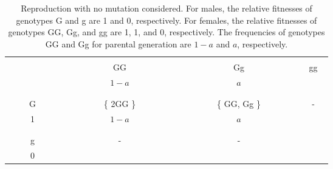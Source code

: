 \documentclass[referee,sn-basic]{sn-jnl}%
\theoremstyle{thmstyleone}%
\theoremstyle{thmstyletwo}%
\theoremstyle{thmstylethree}%
\begin{document}
\begin{table}[htp]
        \caption{Reproduction with no mutation considered. For males, the relative fitnesses of genotypes G and g are 1 and 0, respectively. For females, the relative fitnesses of genotypes GG, Gg, and gg are 1, 1, and 0, respectively. The frequencies of genotypes GG and Gg for parental generation are $1-a$ and $a$, respectively. \label{X-linked}
        }
        \begin{center}
                \begin{tabular}{ c!{\vrule width 1pt}c|c|c }
                        \hline
                        \vspace{-2mm}
                             &     &     &     \\
                       & GG    & Gg    & gg    \\
                        & $1\!-\!a$ & $a$     &       \\
                        \vspace{-3mm} &       &     \\
                        \vspace{-2mm}
                        &     &     &       \\
                        G      & \{ 2GG \} & \{ GG, Gg \}   &-      \\
                        1     & $1\!-\!a$  & $a$          &       \\
                        \vspace{-3mm}      &     &     &     \\
                        \hline
                        \vspace{-2mm}
                        &     &     &          \\
                        g     & -  & -          &       \\
                        \ \ \ \ \ 0\ \ \ \ \       &\ \ \ \ \ \ \ \ \ \ \ \ \  \ \ \ \ \ \ \ \ \ \ \ \ \    & \ \ \ \ \ \ \ \ \ \ \ \ \  \ \ \ \ \ \ \ \ \ \ \ \ \     & \ \    \ \ \         \\
                        \hline
                \end{tabular}
        \end{center}
\end{table}
\end{document}
